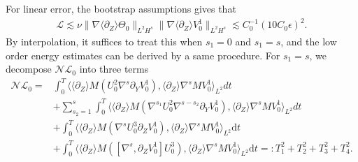 \documentclass[12pt]{article}
\def\d{\mathrm{d}}
\newcommand{\wtb}{\langle\partial_Z\rangle }
\numberwithin{equation}{section}
\begin{document}
    For linear error, the bootstrap assumptions gives that
    \begin{align*}
        \mathcal{L}\lesssim \nu\|\nabla\wtb\Theta_0\|_{L^2H^s}\|\nabla\wtb V^1_0\|_{L^2H^s}\lesssim C^{-1}_0(10C_0\epsilon)^2.
    \end{align*}
	By interpolation, it suffices to treat this when $s_1=0$ and $s_1=s$, and the low order energy estimates can be derived by a same procedure. For $s_1=s$, we decompose $\mathcal{NL}_0$ into three terms
    \begin{align*}
		\mathcal{NL}_0=&\int_{0}^{T}\langle \wtb  M (U^2_0 \nabla^{s} \partial_Y  V^1_0), \wtb \nabla^{s} M V^1_0\rangle_{L^2} dt\\
		&+\sum_{s_2=1}^{s}\int_{0}^{T}\langle \wtb  M (\nabla^{s_1}U^2_0  \nabla^{s-s_2}\partial_YV^1_0 ), \wtb \nabla^{s} M V^1_0\rangle_{L^2} dt\\
        &+ \int_{0}^{T}\langle \wtb  M ( \nabla^{s}U^3_0  \partial_Z  V^1_0), \wtb \nabla^{s} M V^1_0\rangle_{L^2} \d t \\
        &+\int_{0}^{T}\langle \wtb  M ([\nabla^{s},\partial_Z V^1_0]U^3_0 ), \wtb \nabla^{s} M V^1_0\rangle_{L^2} \d t =:T^2_1+T^2_2+T^2_3+T^2_4.
	\end{align*}
\end{document}
